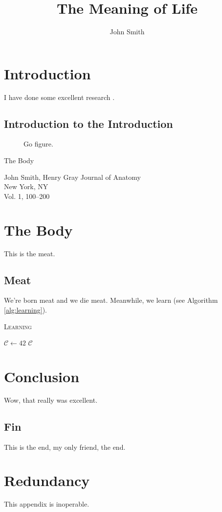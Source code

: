 \documentclass[onehalf,11pt]{beavtex}
\title{The Meaning of Life}
\author{John Smith}
\begin{document}
\maketitle

\mainmatter

\chapter{Introduction}
I have done some excellent research \cite{matrix}.
\section{Introduction to the Introduction}
\begin{figure}[!ht]
\centering
{}
\caption{Go figure.}
\end{figure}

\phantom{}\newpage
\phantom{}\vfill
\begin{center}
\heading
The Body
\end{center}
\vfill
John Smith, Henry Gray
\vfill\noindent
Journal of Anatomy\\
New York, NY\\
Vol. 1, 100--200
\vfill

\chapter{The Body}
This is the meat.
\section{Meat}
We're born meat and we die meat. Meanwhile, we learn (see Algorithm \ref{alg:learning}).

\begin{algorithm}[h]
\caption{\textsc{Learning}}
\label{alg:learning}
\begin{algorithmic}[1]
	\STATE $\mathcal{C} \gets 42$
	\RETURN $\mathcal{C}$
\end{algorithmic}
\end{algorithm}

\chapter{Conclusion}
Wow, that really was excellent.
\section{Fin}
This is the end, my only friend, the end.





\appendix
\chapter{Redundancy}
This appendix is inoperable.
\end{document}
